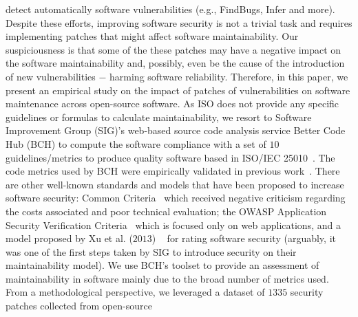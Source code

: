 \documentclass[10pt,conference]{IEEEtran}
\begin{document}
detect automatically software vulnerabilities (e.g., FindBugs, Infer and more). 
%
Despite these efforts, improving software security is not a trivial task and requires 
implementing patches that might affect software maintainability. 
Our suspiciousness is that some of the these patches may have a negative 
impact on the software maintainability and, possibly, even be the cause of the 
introduction of new vulnerabilities $-$ harming software reliability. Therefore, 
in this paper, we present an empirical study on the impact of patches of 
vulnerabilities on software maintenance across open-source software.
%
%
As ISO does not provide any specific guidelines or formulas to calculate 
maintainability, we resort to Software Improvement Group (SIG)'s web-based source 
code analysis service Better Code Hub (BCH) to compute the software compliance 
with a set of $10$ guidelines/metrics to produce quality software 
based in ISO/IEC 25010~\cite{Visser:2016:OREILLY}. The code metrics used by BCH 
were empirically validated in previous work~\cite{Bijlsma:2012:FIR:2317098.2317124, 8530041, cruz2019energyoriented}. 
There are other well-known standards and models that have been proposed
to increase software security: Common Criteria~\cite{common:2009} which received
negative criticism regarding the costs associated and poor technical evaluation;
the OWASP Application Security Verification Criteria~\cite{oswap:2009} which is
focused only on web applications, and a model proposed by Xu et al. ($2013$)
~\cite{6616351} for rating software security (arguably, it was one of the
first steps taken by SIG to introduce security on their maintainability model). 
%
We use BCH's toolset to provide an assessment of maintainability in 
software mainly due to the broad number of metrics used.
From a methodological 
perspective, we leveraged a dataset of $1335$ security patches collected from open-source 
\end{document}
